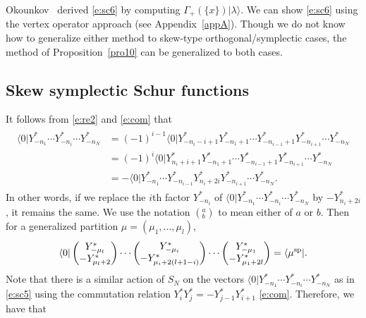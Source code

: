 \documentclass[pdftex]{sigma}
\numberwithin{equation}{section}
\begin{document}
\begin{Remark}
Okounkov~\cite{Oko2001} derived %
\eqref{e:sc6} by %
computing $\Gamma_+(\{x\})|\lambda\rangle$. We can show \eqref{e:sc6} using the vertex operator approach (see Appendix~\ref{appA}). Though
we do not know how to generalize either method to skew-type orthogonal/symplectic cases, the method of Proposition~\ref{pro10} can be generalized to both cases.
\end{Remark}

\subsection{Skew symplectic Schur functions} It follows from \eqref{e:re2} and \eqref{e:com} that
\begin{align*}
\begin{aligned}
\langle 0|Y^*_{-n_1}\cdots Y^*_{-n_i}\cdots Y^*_{-n_N}&{}=(-1)^{i-1}\langle 0|Y^*_{-n_i-i+1}Y^*_{-n_1+1}\cdots Y^*_{-n_{i-1}+1}Y^*_{-n_{i+1}}\cdots Y^*_{-n_N}\\
&{}= (-1)^i\langle 0|Y^*_{n_i+i+1}Y^*_{-n_1+1}\cdots Y^*_{-n_{i-1}+1}Y^*_{-n_{i+1}}\cdots Y^*_{-n_N}\\
&{}= -\langle 0|Y^*_{-n_1}\cdots Y^*_{-n_{i-1}}Y^*_{n_i+2i}Y^*_{-n_{i+1}}\cdots Y^*_{-n_N}.
\end{aligned}
\end{align*}
In other words, if we replace the $i$th factor $Y^*_{-n_i}$ of $\langle 0|Y^*_{-n_1}\cdots Y^*_{-n_i}\cdots Y^*_{-n_N}$ by $-Y^*_{n_i+2i}$, it remains the same. We use the notation $(^a_b)$ to mean either of $a$ or $b$. Then for a generalized partition $\mu=(\mu_1,\dots, \mu_l)$,
\begin{align*}
\langle 0|\begin{pmatrix}{Y^*_{-\mu_l}}\\{-Y^*_{\mu_l+2}}\end{pmatrix}\cdots \begin{pmatrix}{Y^*_{-\mu_i}}\\{-Y^*_{\mu_i+2(l+1-i)}}\end{pmatrix}\cdots \begin{pmatrix}{Y^*_{-\mu_1}}\\{-Y^*_{\mu_1+2l}}\end{pmatrix}=\langle\mu^{\rm sp}|.
\end{align*}
Note that there is a similar action of $S_N$ on the vectors $\langle 0|Y^*_{-n_1}\cdots Y^*_{-n_i}\cdots Y^*_{-n_N}$
as in \eqref{e:sc5} using the commutation relation $Y^*_iY^*_j=-Y^*_{j-1}Y^*_{i+1}$ \eqref{e:com}. Therefore, we have that
\end{document}
